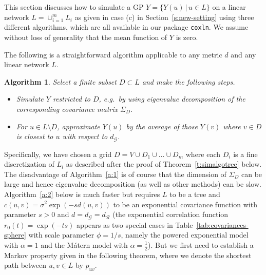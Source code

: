 \documentclass[alpha-refs]{wiley-article}
\newtheorem{alg}{Algorithm}
\begin{document}
This section discusses how to simulate a GP $Y=\{Y(u)\,|\,u\in L\}$ on a linear network $L=\cup_{i=1}^m L_i$ as given in case (c) in Section~\ref{s:new-setting} using three different algorithms, which are all available in our package \texttt{coxln}.
We assume without loss of generality that the mean function of $Y$ is zero.

The following is a straightforward algorithm applicable to any metric $d$ and any linear network $L$.

\begin{alg} Select a finite subset $D\subset L$ and make the following steps.
	\begin{itemize}\label{a:1}
		\item Simulate $Y$ restricted to $D$, e.g.\ by using  eigenvalue decomposition of the corresponding covariance matrix $\Sigma_D$.
		\item For $u\in L\setminus D$, approximate $Y(u)$ by the average of those $Y(v)$ where $v\in D$ is closest to $u$  with respect to $d_{\mathcal G}$.
	\end{itemize}
\end{alg}

Specifically, we have chosen a grid $D=V\cup D_1\cup…\cup D_m$ where each $D_i$ is a fine discretization of $L_i$ as described after the proof of Theorem~\ref{t:simalgotree} below.
The disadvantage of Algorithm~\ref{a:1} is of course that the dimension of $\Sigma_D$ can be large and hence eigenvalue decomposition (as well as other methods) can be slow. Algorithm~\ref{a:2} below is much faster but requires $L$ to be a tree and $c(u,v) = \sigma^2\exp(-s d(u, v))$ to be an exponential covariance function with parameter $s>0$ and $d=d_{\mathcal G}=d_{\mathcal R}$ (the exponential correlation function $r_0(t)=\exp(-ts)$ appears as two special cases in Table~\ref{tab:covariances-sphere} with scale parameter $\phi=1/s$, namely the powered exponential model with $\alpha=1$ and the M{\'a}tern model with $\alpha=\tfrac12$). But we first need to establish a Markov property given in the following theorem, where we denote the shortest path between $u,v\in L$ by $p_{uv}$.
\end{document}

